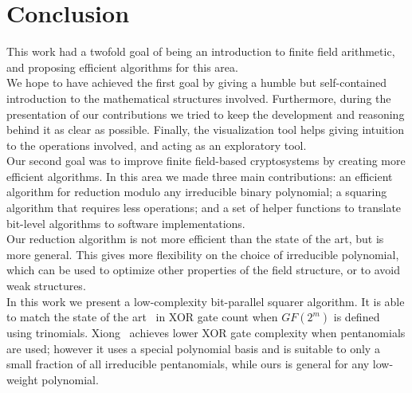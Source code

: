 


\section{Conclusion}

This work had a twofold goal of being an introduction to finite field arithmetic, and proposing efficient algorithms for this area. \\

We hope to have achieved the first goal by giving a humble but self-contained introduction to the mathematical structures involved. Furthermore, during the presentation of our contributions we tried to keep the development and reasoning behind it as clear as possible. Finally, the visualization tool helps giving intuition to the operations involved, and acting as an exploratory tool. \\

Our second goal was to improve finite field-based cryptosystems by creating more efficient algorithms. In this area we made three main contributions: an efficient algorithm for reduction modulo any irreducible binary polynomial; a squaring algorithm that requires less operations; and a set of helper functions to translate bit-level algorithms to software implementations. \\

Our reduction algorithm is not more efficient than the state of the art, but is more general. This gives more flexibility on the choice of irreducible polynomial, which can be used to optimize other properties of the field structure, or to avoid weak structures. \\

In this work we present a low-complexity bit-parallel squarer algorithm. It is able to match the state of the art~\cite{wu2002bit} in XOR gate count when $GF(2^m)$ is defined using trinomials. Xiong~\cite{xiong2014gf} achieves lower XOR gate complexity when pentanomials are used; however it uses a special polynomial basis and is suitable to only a small fraction of all irreducible pentanomials, while ours is general for any low-weight polynomial.\\

